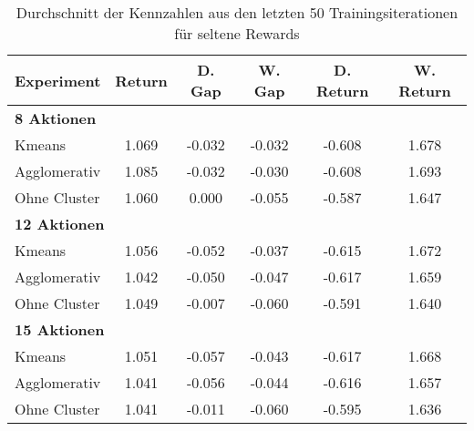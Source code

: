 \begin{table}[ht]
\centering
\caption{Durchschnitt der Kennzahlen aus den letzten 50 Trainingsiterationen für seltene Rewards}
\begin{tabular}{lccccc}
\hline
\textbf{Experiment} & \textbf{Return} & \textbf{D. Gap} & \textbf{W. Gap} & \textbf{D. Return} & \textbf{W. Return} \\
\hline
\multicolumn{6}{l}{\textbf{8 Aktionen}} \\
\hspace{1em}Kmeans & 1.069 & -0.032 & -0.032& -0.608 & 1.678 \\
\hspace{1em}Agglomerativ & 1.085 & -0.032 & -0.030& -0.608 & 1.693 \\
\hspace{1em}Ohne Cluster & 1.060 & 0.000 & -0.055& -0.587 & 1.647 \\
\hline
\multicolumn{6}{l}{\textbf{12 Aktionen}} \\
\hspace{1em}Kmeans & 1.056 & -0.052 & -0.037& -0.615 & 1.672 \\
\hspace{1em}Agglomerativ & 1.042 & -0.050 & -0.047& -0.617 & 1.659 \\
\hspace{1em}Ohne Cluster & 1.049 & -0.007 & -0.060& -0.591 & 1.640 \\
\hline
\multicolumn{6}{l}{\textbf{15 Aktionen}} \\
\hspace{1em}Kmeans & 1.051 & -0.057 & -0.043& -0.617 & 1.668 \\
\hspace{1em}Agglomerativ & 1.041 & -0.056 & -0.044& -0.616 & 1.657 \\
\hspace{1em}Ohne Cluster & 1.041 & -0.011 & -0.060& -0.595 & 1.636 \\
\hline
\end{tabular}
\end{table}


